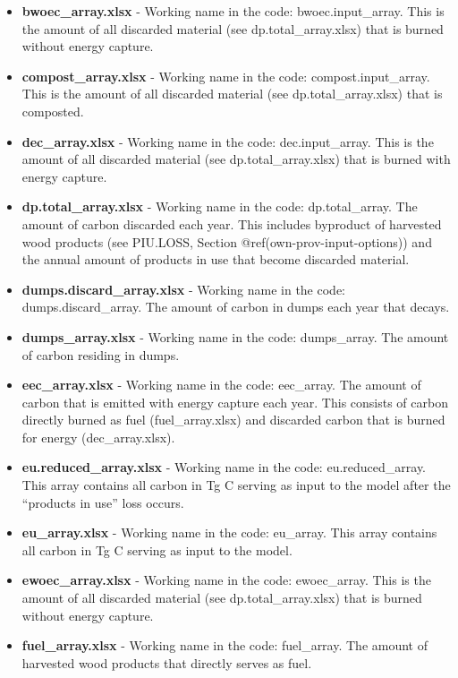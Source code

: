 \documentclass[
  openany]{book}
\begin{document}
\begin{itemize}
\item
  \textbf{bwoec\_array.xlsx} - Working name in the code:
  bwoec.input\_array. This is the amount of all discarded material (see
  dp.total\_array.xlsx) that is burned without energy capture.
\item
  \textbf{compost\_array.xlsx} - Working name in the code:
  compost.input\_array. This is the amount of all discarded material
  (see dp.total\_array.xlsx) that is composted.
\item
  \textbf{dec\_array.xlsx} - Working name in the code: dec.input\_array.
  This is the amount of all discarded material (see
  dp.total\_array.xlsx) that is burned with energy capture.
\item
  \textbf{dp.total\_array.xlsx} - Working name in the code:
  dp.total\_array. The amount of carbon discarded each year. This
  includes byproduct of harvested wood products (see PIU.LOSS, Section
  @ref(own-prov-input-options)) and the annual amount of products in use
  that become discarded material.
\item
  \textbf{dumps.discard\_array.xlsx} - Working name in the code:
  dumps.discard\_array. The amount of carbon in dumps each year that
  decays.
\item
  \textbf{dumps\_array.xlsx} - Working name in the code: dumps\_array.
  The amount of carbon residing in dumps.
\item
  \textbf{eec\_array.xlsx} - Working name in the code: eec\_array. The
  amount of carbon that is emitted with energy capture each year. This
  consists of carbon directly burned as fuel (fuel\_array.xlsx) and
  discarded carbon that is burned for energy (dec\_array.xlsx).
\item
  \textbf{eu.reduced\_array.xlsx} - Working name in the code:
  eu.reduced\_array. This array contains all carbon in Tg C serving as
  input to the model after the ``products in use'' loss occurs.
\item
  \textbf{eu\_array.xlsx} - Working name in the code: eu\_array. This
  array contains all carbon in Tg C serving as input to the model.
\item
  \textbf{ewoec\_array.xlsx} - Working name in the code: ewoec\_array.
  This is the amount of all discarded material (see
  dp.total\_array.xlsx) that is burned without energy capture.
\item
  \textbf{fuel\_array.xlsx} - Working name in the code: fuel\_array. The
  amount of harvested wood products that directly serves as fuel.

\end{itemize}
\end{document}
